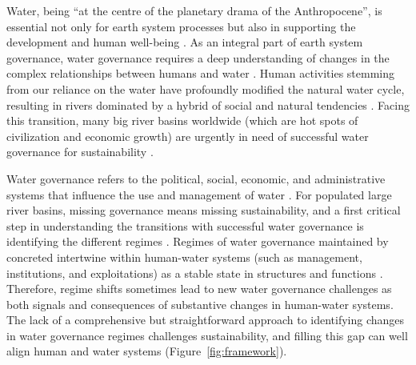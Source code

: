 \label{Intro.}
Water, being ``at the centre of the planetary drama of the Anthropocene'', is essential not only for earth system processes but also in supporting the development and human well-being
\cite{gleeson2020a,gleeson2020b}.
As an integral part of earth system governance, water governance requires a deep understanding of changes in the complex relationships between humans and water
\cite{ahlstrom2021,biermann2012,steffen2020}.
Human activities stemming from our reliance on the water have profoundly modified the natural water cycle, resulting in rivers dominated by a hybrid of social and natural tendencies
\cite{sivapalan2012,qin2014,abbott2019}.
Facing this transition, many big river basins worldwide (which are hot spots of civilization and economic growth) are urgently in need of successful water governance for sustainability
\cite{best2019,dibaldassarre2019}.

Water governance refers to the political, social, economic, and administrative systems that influence the use and management of water \cite{oecd2018, wang2017}.
For populated large river basins, missing governance means missing sustainability, and a first critical step in understanding the transitions with successful water governance is identifying the different regimes \cite{kjellen2015, grafton2013}.
Regimes of water governance maintained by concreted intertwine within human-water systems (such as management, institutions, and exploitations) as a stable state in structures and functions
\cite{falkenmark2021,bressers2013,loch2020}.
Therefore, regime shifts sometimes lead to new water governance challenges as both signals and consequences of substantive changes in human-water systems.
The lack of a comprehensive but straightforward approach to identifying changes in water governance regimes challenges sustainability, and filling this gap can well align human and water systems (Figure~\ref{fig:framework}).

